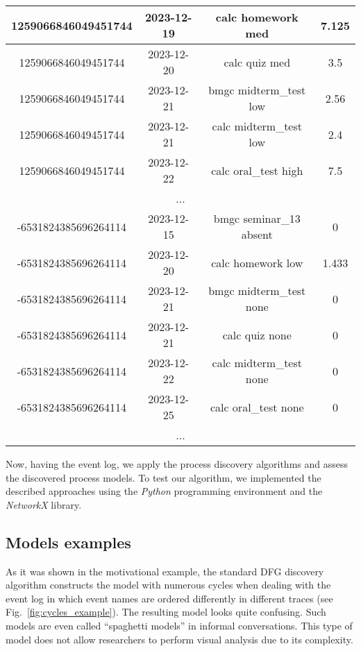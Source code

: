 \documentclass[11pt]{article}
\theoremstyle{definition}
\begin{document}
\begin{table}[htb]
\begin{tabular}{c c c c}
    \hline
    1259066846049451744 & 2023-12-19 & calc homework med & 7.125 \\
    \hline
    1259066846049451744 & 2023-12-20 & calc quiz med & 3.5 \\
    \hline
    1259066846049451744 & 2023-12-21 & bmgc midterm\_test low & 2.56 \\
    \hline
    1259066846049451744 & 2023-12-21 & calc midterm\_test low & 2.4 \\
    \hline
    1259066846049451744 & 2023-12-22 & calc oral\_test high & 7.5 \\
    \hline
    \multicolumn{4}{c}{...}\\
    \hline
    -6531824385696264114 & 2023-12-15 & bmgc seminar\_13 absent & 0 \\
    \hline
    -6531824385696264114 & 2023-12-20 & calc homework low & 1.433 \\
    \hline
    -6531824385696264114 & 2023-12-21 & bmgc midterm\_test none & 0 \\
    \hline
    -6531824385696264114 & 2023-12-21 & calc quiz none & 0 \\
    \hline
    -6531824385696264114 & 2023-12-22 & calc midterm\_test none & 0 \\
    \hline
    -6531824385696264114 & 2023-12-25 & calc oral\_test none & 0 \\
    \hline
    \multicolumn{4}{c}{...}\\
    \hline\hline
    \end{tabular}
  \label{tbl:event_log}
\end{table}

Now, having the event log, we apply the process discovery algorithms and assess the discovered process models. To test our algorithm, we implemented the described approaches \citep{Repository} using the \emph{Python} programming environment and the \emph{NetworkX} library. 

\subsection{Models examples}\label{sec:models_examples}

As it was shown in the motivational example, the standard DFG discovery algorithm constructs the model with numerous cycles when dealing with the event log in which event names are ordered differently in different traces (see Fig.~\ref{fig:cycles_example}).
The resulting model looks quite confusing.
Such models are even called ``spaghetti models'' in informal conversations.
This type of model does not allow researchers to perform visual analysis due to its complexity. 
\end{document}
